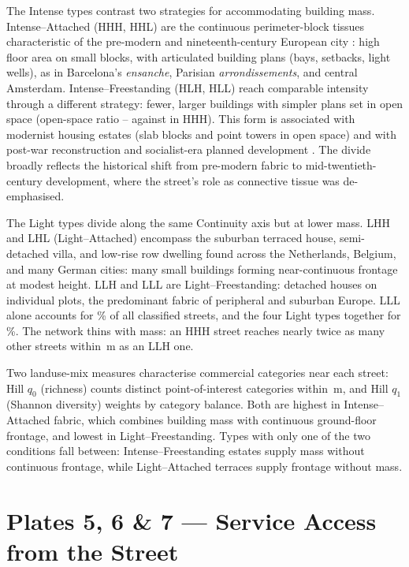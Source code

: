 \documentclass[review,authoryear]{elsarticle}
\begin{document}
The Intense types contrast two strategies for accommodating building mass. Intense--Attached (HHH, HHL) are the continuous perimeter-block tissues characteristic of the pre-modern and nineteenth-century European city \citep{panerai2004urban}: high floor area on small blocks, with articulated building plans (bays, setbacks, light wells), as in Barcelona's \emph{ensanche}, Parisian \emph{arrondissements}, and central Amsterdam. Intense--Freestanding (HLH, HLL) reach comparable intensity through a different strategy: fewer, larger buildings with simpler plans set in open space (open-space ratio \octHLHosr--\octHLLosr{} against \octHHHosr{} in HHH). This form is associated with modernist housing estates (slab blocks and point towers in open space) and with post-war reconstruction and socialist-era planned development \citep{stanilov2007post}. The divide broadly reflects the historical shift from pre-modern fabric to mid-twentieth-century development, where the street's role as connective tissue was de-emphasised.

The Light types divide along the same Continuity axis but at lower mass. LHH and LHL (Light--Attached) encompass the suburban terraced house, semi-detached villa, and low-rise row dwelling found across the Netherlands, Belgium, and many German cities: many small buildings forming near-continuous frontage at modest height. LLH and LLL are Light--Freestanding: detached houses on individual plots, the predominant fabric of peripheral and suburban Europe. LLL alone accounts for \octLLLpct\% of all classified streets, and the four Light types together for \pctLightTypes\%. The network thins with mass: an HHH street reaches nearly twice as many other streets within \,m as an LLH one.

Two landuse-mix measures characterise commercial categories near each street: Hill $q_0$ (richness) counts distinct point-of-interest categories within \,m, and Hill $q_1$ (Shannon diversity) weights by category balance. Both are highest in Intense--Attached fabric, which combines building mass with continuous ground-floor frontage, and lowest in Light--Freestanding. Types with only one of the two conditions fall between: Intense--Freestanding estates supply mass without continuous frontage, while Light--Attached terraces supply frontage without mass.

\section{Plates 5, 6 \& 7 --- Service Access from the Street}
\label{sec:plate5}
\end{document}
